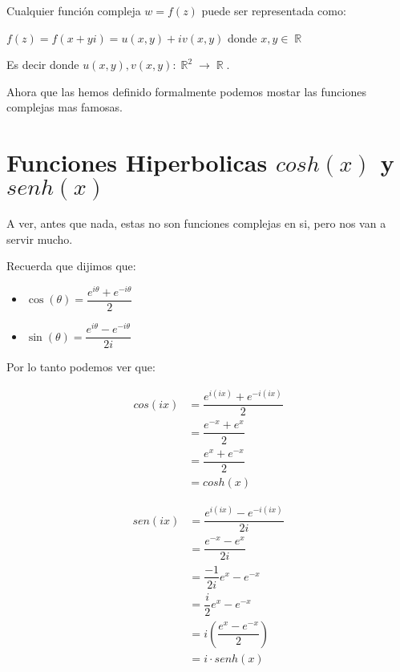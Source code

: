 \documentclass[12pt, fleqn]{report}                             %
\newcommand{\Wrap}[1]{\left( #1 \right)}                        %
\newcommand{\pfrac}[2]{\Wrap{\dfrac{#1}{#2}}}                   %
\newenvironment{MultiLineEquation}[1]                           %
        {\begin{equation}\begin{alignedat}{#1}}                     %
        {\end{alignedat}\end{equation}}                             %
\DeclareMathOperator \Reals     {\mathbb{R}}                     %
\newcommand{\Cos}[1]{\cos\Wrap{#1}}                             %
\newcommand{\Sin}[1]{\sin\Wrap{#1}}                             %
\begin{document}
        Cualquier función compleja $w = f(z)$ puede ser representada como:

        $f(z) = f(x+yi) = u(x, y) + iv(x, y)$ donde $x, y \in \Reals$

        Es decir donde $u(x,y), v(x,y) : \Reals^2 \to \Reals$.


        Ahora que las hemos definido formalmente podemos mostar las funciones complejas
        mas famosas.





        \clearpage
        \section{Funciones Hiperbolicas $cosh(x)$ y $senh(x)$}

            A ver, antes que nada, estas no son funciones complejas en si, pero nos
            van a servir mucho.

            Recuerda que dijimos que:

            \begin{itemize}
                \item $\Cos{\theta} = \dfrac{ e^{i\theta} + e^{-i\theta} }{2}$
                \item $\Sin{\theta} = \dfrac{ e^{i\theta} - e^{-i\theta} }{2i}$
            \end{itemize}

            Por lo tanto podemos ver que:

            \begin{MultiLineEquation}{2}
                cos(ix) &= \dfrac{ e^{i(ix)} + e^{-i(ix)} }{2}  \\
                        &= \dfrac{ e^{-x} + e^x }{2}            \\
                        &= \dfrac{ e^x + e^{-x} }{2}            \\
                        &= cosh(x) 
            \end{MultiLineEquation}

            \begin{MultiLineEquation}{2}
                sen(ix) &= \dfrac{ e^{i(ix)} - e^{-i(ix)} }{2i} \\
                        &= \dfrac{ e^{-x} - e^x }{2i}           \\
                        &= \dfrac{-1}{2i} e^x - e^{-x}          \\
                        &= \dfrac{i}{2} e^x - e^{-x}            \\
                        &= i\pfrac{e^x - e^{-x}}{2}             \\
                        &= i \cdot senh(x) 
            \end{MultiLineEquation}
\end{document}
